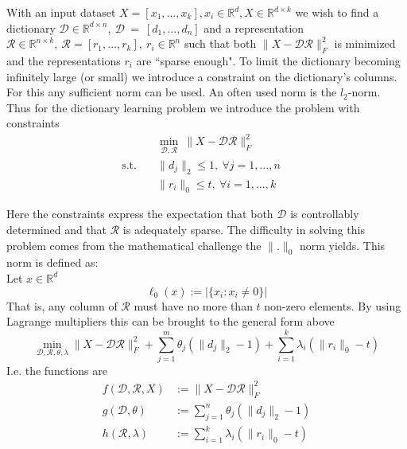 \documentclass{article}
\newcommand{\R}{\mathbb{R}}
\newcommand{\Rr}{\mathcal{R}}
\newcommand{\D}{\mathcal{D}}
\begin{document}
\noindent With an input dataset $X=[x_1, \dots, x_k],  x_i \in \R^d,  X \in \R^{d\times k}$ we wish to find a dictionary $\D \in \R^{d\times n}, \   \D~=~[d_1, \dots, d_n]$ and a representation $\Rr \in\R^{n\times k}, \ \Rr = [r_1,\dots,r_k], \ r_i\in\R^n $  such that both $\|X-\D\Rr\|_F^2$ is minimized and the representations $r_i$ are ``sparse enough". To limit the dictionary becoming infinitely large (or small) we introduce a constraint on the dictionary's columns. For this any sufficient norm can be used. An often used norm is the $l_2$-norm. 
Thus for the dictionary learning problem we introduce the problem with constraints
\begin{align*}
         &\min_{\D, \Rr} \ \|X  -\D \Rr\|_F^2   \quad   \\
         \text{s.t.}  \quad  &\|d_j\|_2 \leq 1, \ \forall j=1, ...,n  \quad \\
          \quad  &\|r_i\|_0 \leq t,  \ \forall i=1, ...,k  \quad 
\end{align*}

\noindent Here the constraints express the expectation that both $\D$ is controllably determined and that $\Rr$ is adequately sparse. The difficulty in solving this problem comes from the mathematical challenge the $\| . \|_0$ norm yields. This norm is defined as:\\ 

\qquad\qquad\qquad\qquad Let $x \in \R^d$
\[
\ell_0(x) := \big|\{x_i : x_i \not= 0\}\big|
\]That is, any column of $\Rr$ must have no more than $t$ non-zero elements. By using Lagrange multipliers this can be brought to the general form above
\[
\min_{\D, \Rr, \theta, \lambda} \|X  -\D\Rr\|_F^2 + \sum_{j=1}^m \theta_j (\| d_j\|_2 - 1)+ \sum_{i=1}^k \lambda_i (\| r_i \|_0 - t)
\]
I.e. the functions are
\[
\begin{split}
f(\D, \Rr, X) &:= \| X -\D \Rr \|_F^2 \\
g(\D, \theta) &:= \sum_{j=1}^n \theta_j (\| d_j\|_2 - 1) \\
h(\Rr, \lambda) &:= \sum_{i=1}^k \lambda_i (\| r_i \|_0 - t)
\end{split}
\]
\end{document}
